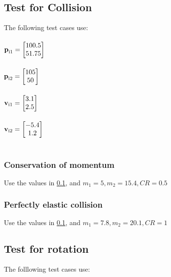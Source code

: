 \documentclass[12pt]{article}
\begin{document}
\subsection{Test for Collision} \label{testCollision}
The following test cases use:\\ \\
$ \textbf p_\text{i1} = \begin{bmatrix}
	100.5\\
	51.75\\
	\end{bmatrix}$\\
~\newline 
\noindent \\
$ \textbf p_\text{i2} = \begin{bmatrix}
	105\\
	50\\
	\end{bmatrix}$\\
~\newline 
\noindent\\
$ \textbf v_\text{i1} = \begin{bmatrix}
	3.1\\
	2.5\\
	\end{bmatrix}$\\
~\newline 
\noindent\\
$ \textbf v_\text{i2} = \begin{bmatrix}
	-5.4\\
	1.2\\
	\end{bmatrix}$\\
~\newline 
\noindent

\subsubsection{Conservation of momentum} \label{testCollision1}
Use the values in \ref{testCollision}, and $m_\text{1} = 5, m_\text{2} = 15.4, CR = 0.5$


\subsubsection{Perfectly elastic collision} \label{testCollision2}
Use the values in \ref{testCollision}, and  $m_\text{1} = 7.8, m_\text{2} = 20.1, CR = 1$
	
\subsection{Test for rotation} \label{testRotation}
The folllowing test cases use:
\end{document}
